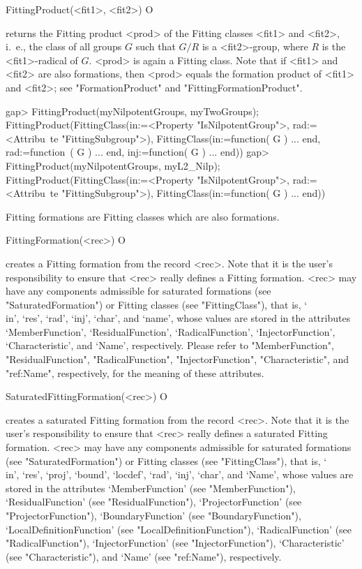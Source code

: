 \>FittingProduct(<fit1>, <fit2>) O

returns the Fitting product <prod> of the Fitting classes <fit1> and <fit2>,
i.~e., the class of all groups $G$ such that $G/R$ is  a <fit2>-group, where
$R$ is the <fit1>-radical of $G$.  <prod> is again a Fitting class.
Note that if <fit1> and <fit2> are also
formations, then <prod> equals the
formation product of <fit1> and <fit2>; see "FormationProduct" 
and
"FittingFormationProduct".

\beginexample
gap> FittingProduct(myNilpotentGroups, myTwoGroups);
FittingProduct(FittingClass(in:=<Property "IsNilpotentGroup">, rad:=<Attribu\
te "FittingSubgroup">), FittingClass(in:=function( G ) ... end, rad:=function\
( G ) ... end, inj:=function( G ) ... end))
gap> FittingProduct(myNilpotentGroups, myL2_Nilp);
FittingProduct(FittingClass(in:=<Property "IsNilpotentGroup">, rad:=<Attribu\
te "FittingSubgroup">), FittingClass(in:=function( G ) ... end))
\endexample


\null

\index{Fitting formations!creating}

Fitting formations are Fitting classes which are also formations.

\>FittingFormation(<rec>) O

creates a Fitting formation from the record <rec>. Note that it is the user's 
responsibility to ensure that <rec> really defines a Fitting formation.
<rec> may  have any components admissible for saturated formations (see
"SaturatedFormation")  or Fitting classes (see "FittingClass"), that is,
`\\in', `res', `rad', `inj', `char', and `name', 
 whose values are stored in the attributes `MemberFunction',
`ResidualFunction', `RadicalFunction',
`InjectorFunction', `Characteristic', and `Name', respectively.
Please refer
to "MemberFunction",  "ResidualFunction", "RadicalFunction",
"InjectorFunction",  "Characteristic", and "ref:Name", respectively, for the
meaning of these attributes.


\>SaturatedFittingFormation(<rec>) O

creates a saturated Fitting formation from the record <rec>. Note that it is the user's responsibility to ensure that <rec> really
defines a saturated Fitting formation. <rec> may have any
components admissible for saturated formations (see "SaturatedFormation") or
Fitting classes (see "FittingClass"), that is, `\\in', `res', `proj',
`bound', `locdef', `rad', `inj',   `char', and `Name', whose values are
stored in the attributes `MemberFunction' (see "MemberFunction"),
`ResidualFunction' (see "ResidualFunction"),
 `ProjectorFunction' (see "ProjectorFunction"), `BoundaryFunction' (see
"BoundaryFunction"), `LocalDefinitionFunction' (see
"LocalDefinitionFunction"), `RadicalFunction' (see "RadicalFunction"),
`InjectorFunction' (see "InjectorFunction"), `Characteristic' (see
"Characteristic"), and `Name' (see "ref:Name"), respectively.



